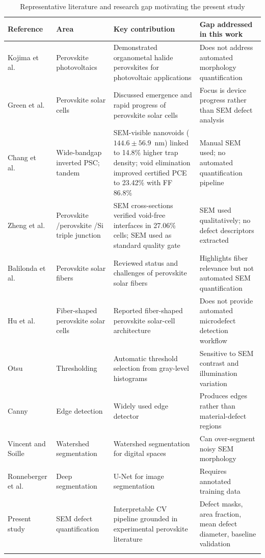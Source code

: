\documentclass[pdflatex,sn-mathphys-num,iicol]{sn-jnl}
\theoremstyle{thmstyleone}
\theoremstyle{thmstyletwo}
\theoremstyle{thmstylethree}
\begin{document}
\begin{table}[!htbp]
\caption{Representative literature and research gap motivating the present study}
\label{tab:literature_review}
\begin{tabular}{@{}p{2.8cm}p{3.0cm}p{4.6cm}p{4.8cm}@{}}
\toprule
Reference & Area & Key contribution & Gap addressed in this work \\
\midrule
Kojima et al.\ \cite{kojima2009}
  & Perovskite photovoltaics
  & Demonstrated organometal halide perovskites for photovoltaic applications
  & Does not address automated morphology quantification \\[4pt]
Green et al.\ \cite{green2014}
  & Perovskite solar cells
  & Discussed emergence and rapid progress of perovskite solar cells
  & Focus is device progress rather than SEM defect analysis \\[4pt]
Chang et al.\ \cite{chang2026}
  & Wide-bandgap inverted PSC; tandem
  & SEM-visible nanovoids ($144.6 \pm 56.9$~nm) linked to 14.8\% higher
    trap density; void elimination improved certified PCE to 23.42\%
    with FF 86.8\%
  & Manual SEM used; no automated quantification pipeline \\[4pt]
Zheng et al.\ \cite{zheng2025}
  & Perovskite
  /perovskite
  /Si triple junction
  & SEM cross-sections verified void-free interfaces in 27.06\% cells;
    SEM used as standard quality gate
  & SEM used qualitatively; no defect descriptors extracted \\[4pt]
Balilonda et al.\ \cite{balilonda2019}
  & Perovskite solar fibers
  & Reviewed status and challenges of perovskite solar fibers
  & Highlights fiber relevance but not automated SEM quantification \\[4pt]
Hu et al.\ \cite{hu2016}
  & Fiber-shaped perovskite solar cells
  & Reported fiber-shaped perovskite solar-cell architecture
  & Does not provide automated microdefect detection workflow \\[4pt]
Otsu \cite{otsu1979}
  & Thresholding
  & Automatic threshold selection from gray-level histograms
  & Sensitive to SEM contrast and illumination variation \\[4pt]
Canny \cite{canny1986}
  & Edge detection
  & Widely used edge detector
  & Produces edges rather than material-defect regions \\[4pt]
Vincent and Soille \cite{vincent1991}
  & Watershed segmentation
  & Watershed segmentation for digital spaces
  & Can over-segment noisy SEM morphology \\[4pt]
Ronneberger et al.\ \cite{ronneberger2015}
  & Deep segmentation
  & U-Net for image segmentation
  & Requires annotated training data \\[4pt]
Present study
  & SEM defect quantification
  & Interpretable CV pipeline grounded in experimental perovskite literature
  & Defect masks, area fraction, mean defect diameter, baseline validation \\
\botrule
\end{tabular}
\end{table}
\end{document}
